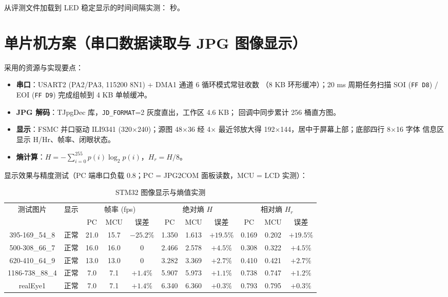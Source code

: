 \documentclass[a4paper]{article}
\begin{document}
从评测文件加载到 LED 稳定显示的时间间隔实测：\underline{\hspace{3em}} 秒。

\section{单片机方案（串口数据读取与 JPG 图像显示）}

采用的资源与实现要点：

\begin{itemize}
\item \textbf{串口}：USART2 (PA2/PA3, 115200 8N1) + DMA1 通道 6 循环模式常驻收数
（8 KB 环形缓冲）；20 ms 周期任务扫描 SOI (\texttt{FF D8}) / EOI (\texttt{FF D9})
完成组帧到 4 KB 单帧缓冲。
\item \textbf{JPG 解码}：TJpgDec 库，\texttt{JD\_FORMAT}=2 灰度直出，工作区 4.6 KB；
回调中同步累计 256 桶直方图。
\item \textbf{显示}：FSMC 并口驱动 ILI9341 (320$\times$240)；源图 48$\times$36 经
4$\times$ 最近邻放大得 192$\times$144，居中于屏幕上部；底部四行 8$\times$16 字体
信息区显示 H/Hr、帧率、闭眼状态。
\item \textbf{熵计算}：$H = -\sum_{i=0}^{255} p(i) \log_2 p(i)$，$H_r = H / 8$。
\end{itemize}

显示效果与精度测试（PC 端串口负载 0.8；PC = JPG2COM 面板读数，MCU = LCD 实测）：

\begin{table}[H]
\footnotesize
\centering
\caption{STM32 图像显示与熵值实测}
\begin{tabular}{|c|c|ccc|ccc|ccc|}
\hline
\multirow{2}{*}{测试图片} & \multirow{2}{*}{显示} & \multicolumn{3}{c|}{帧率 (fps)} & \multicolumn{3}{c|}{绝对熵 $H$} & \multicolumn{3}{c|}{相对熵 $H_r$} \\
\cline{3-11}
 &  & PC & MCU & 误差 & PC & MCU & 误差 & PC & MCU & 误差 \\
\hline
395-169\_54\_8   & 正常 & 21.0 & 15.7 & $-25.2\%$ & 1.350 & 1.613 & $+19.5\%$ & 0.169 & 0.202 & $+19.5\%$ \\
\hline
500-308\_66\_7   & 正常 & 16.0 & 16.0 & $0$       & 2.466 & 2.578 & $+4.5\%$  & 0.308 & 0.322 & $+4.5\%$ \\
\hline
620-410\_64\_9   & 正常 & 13.0 & 13.0 & $0$       & 3.282 & 3.369 & $+2.7\%$  & 0.410 & 0.421 & $+2.7\%$ \\
\hline
1186-738\_88\_4  & 正常 & 7.0  & 7.1  & $+1.4\%$  & 5.907 & 5.973 & $+1.1\%$  & 0.738 & 0.747 & $+1.2\%$ \\
\hline
realEye1         & 正常 & 7.0  & 7.1  & $+1.4\%$  & 6.340 & 6.360 & $+0.3\%$  & 0.793 & 0.795 & $+0.3\%$ \\
\hline
\end{tabular}
\end{table}
\end{document}
